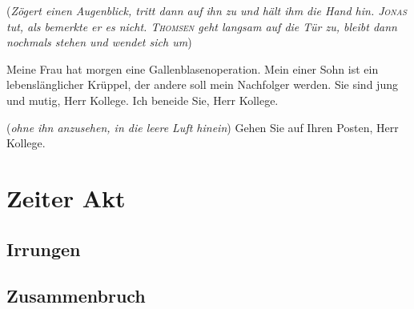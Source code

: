 \documentclass[
	final,
	a4paper,
	ngerman,
	mpinclude = true, %
	twoside = true,
	open = right,
	cleardoublepage = plain,
	DIV = 13,
	BCOR = 1cm,
	titlepage = firstiscover,
	]{scrbook}
\newcommand{\act}{\chapter}
\newcommand{\scene}{\setcounter{subscene}{1}\section}
\newcommand{\direction}[1]{(\textit{#1})}
\newcounter{subscene}
\newcommand{\thecharacter}[1]{\textup{\textsc{#1}}\xspace}
\newcommand{\theThomsen}{\thecharacter{Thomsen}}
\newcommand{\theJonas}{\thecharacter{Jonas}}
\newcommand{\character}[1]{\item[#1]}
\newcommand{\Jonas}{\character{\theJonas}}
\begin{document}
\begin{play}
\direction{Zögert einen Augenblick, tritt dann auf ihn zu und hält ihm die Hand hin. \theJonas tut, als bemerkte er es nicht. \theThomsen geht langsam auf die Tür zu, bleibt dann nochmals stehen und wendet sich um}

Meine Frau hat morgen eine Gallenblasenoperation. Mein einer Sohn ist ein lebenslänglicher Krüppel, der andere soll mein Nachfolger werden. Sie sind jung und mutig, Herr Kollege. Ich beneide Sie, Herr Kollege.

\Jonas \direction{ohne ihn anzusehen, in die leere Luft hinein} Gehen Sie auf Ihren Posten, Herr Kollege.
\end{play}



\act{Zeiter Akt}

\scene{Irrungen}
\label{scene:VI}

\scene{Zusammenbruch}
\label{scene:VII}
\end{document}
